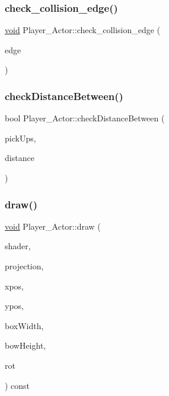\subsubsection{\texorpdfstring{check\+\_\+collision\+\_\+edge()}{check\_collision\_edge()}}
{\footnotesize\ttfamily \hyperlink{imgui__impl__opengl3__loader_8h_ac668e7cffd9e2e9cfee428b9b2f34fa7}{void} Player\+\_\+\+Actor\+::check\+\_\+collision\+\_\+edge (\begin{DoxyParamCaption}\item[{std\+::shared\+\_\+ptr$<$ \hyperlink{classEdge__Actor}{Edge\+\_\+\+Actor} $>$}]{edge }\end{DoxyParamCaption})}

\mbox{\label{classPlayer__Actor_a7c6408496addd95b7c502f3c78916e95}} 
\subsubsection{\texorpdfstring{check\+Distance\+Between()}{checkDistanceBetween()}}
{\footnotesize\ttfamily bool Player\+\_\+\+Actor\+::check\+Distance\+Between (\begin{DoxyParamCaption}\item[{std\+::shared\+\_\+ptr$<$ \hyperlink{classPickUps__Actor}{Pick\+Ups\+\_\+\+Actor} $>$}]{pick\+Ups,  }\item[{float}]{distance }\end{DoxyParamCaption})}

\mbox{\label{classPlayer__Actor_a832baa3e201dea536546a9faca8fd952}} 
\subsubsection{\texorpdfstring{draw()}{draw()}}
{\footnotesize\ttfamily \hyperlink{imgui__impl__opengl3__loader_8h_ac668e7cffd9e2e9cfee428b9b2f34fa7}{void} Player\+\_\+\+Actor\+::draw (\begin{DoxyParamCaption}\item[{std\+::shared\+\_\+ptr$<$ \hyperlink{classShader__Actor}{Shader\+\_\+\+Actor} $>$}]{shader,  }\item[{glm\+::mat4}]{projection,  }\item[{float}]{xpos,  }\item[{float}]{ypos,  }\item[{float}]{box\+Width,  }\item[{float}]{bow\+Height,  }\item[{float}]{rot }\end{DoxyParamCaption}) const}

